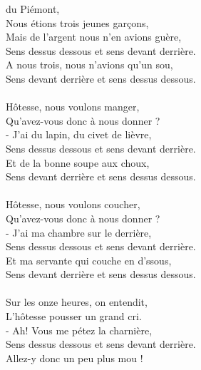 
 du Piémont,~~~~~~~~~~~~~~~~~\bissimple
\\Nous étions trois jeunes garçons,  ~~~~~~~~~~~~~~~\bissimple
\\Mais de l'argent nous n'en avions guère,
\\Sens dessus dessous et sens devant derrière.
\\A nous trois, nous n'avions qu'un sou,
\\Sens devant derrière et sens dessus dessous. ~~~~~~~~~~~~~~~~~~~\bissimple
\\\\Hôtesse, nous voulons manger,~~~~~~~~~~~~~~~~~\bissimple
\\Qu'avez-vous donc à nous donner ?  ~~~~~~~~~~  \bissimple
\\- J'ai du lapin, du civet de lièvre,
\\Sens dessus dessous et sens devant derrière.
\\Et de la bonne soupe aux choux,
\\Sens devant derrière et sens dessus dessous. \bissimple
\\\\Hôtesse, nous voulons coucher,~~~~~~~~~~~~~~~\bissimple
\\Qu'avez-vous donc à nous donner ?~~~~~~~~~~~~\bissimple
\\- J'ai ma chambre sur le derrière,
\\Sens dessus dessous et sens devant derrière.
\\Et ma servante qui couche en d'ssous,
\\Sens devant derrière et sens dessus dessous. \bissimple
\\\\Sur les onze heures, on entendit,~~~~~~~~~~~~~~~\bissimple
\\L'hôtesse pousser un grand cri. ~~~~~~~~~~~~~~~~\bissimple
\\- Ah! Vous me pétez la charnière,
\\Sens dessus dessous et sens devant derrière.
\\Allez-y donc un peu plus mou !
